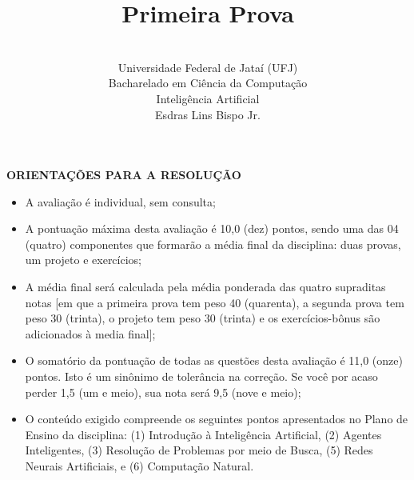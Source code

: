 \documentclass[12pt,a4paper,oneside]{article}
\author{\\Universidade Federal de Jataí (UFJ)\\Bacharelado em Ciência da Computação \\Inteligência Artificial \\Esdras Lins Bispo Jr.}
\title{\sc \huge Primeira Prova}
\begin{document}
\maketitle

{\bf ORIENTAÇÕES PARA A RESOLUÇÃO}

\begin{itemize}
	\item A avaliação é individual, sem consulta;
	\item A pontuação máxima desta avaliação é 10,0 (dez) pontos, sendo uma das 04 (quatro) componentes que formarão a média final da disciplina: duas provas, um projeto e exercícios;
	\item A média final será calculada pela média ponderada das quatro supraditas notas [em que a primeira prova tem peso 40 (quarenta), a segunda prova tem peso 30 (trinta), o projeto tem peso 30 (trinta) e os exercícios-bônus são adicionados à media final];
	\item O somatório da pontuação de todas as questões desta avaliação é 11,0 (onze) pontos. Isto é um sinônimo de tolerância na correção. Se você por acaso perder 1,5 (um e meio), sua nota será 9,5 (nove e meio);
	\item O conteúdo exigido compreende os seguintes pontos apresentados no Plano de Ensino da disciplina: (1) Introdução à Inteligência Artificial, (2) Agentes Inteligentes, (3) Resolução de Problemas por meio de Busca, (5) Redes Neurais Artificiais, e  (6) Computação Natural.
\end{itemize}

\begin{center}
\end{center}

\newpage
\end{document}
